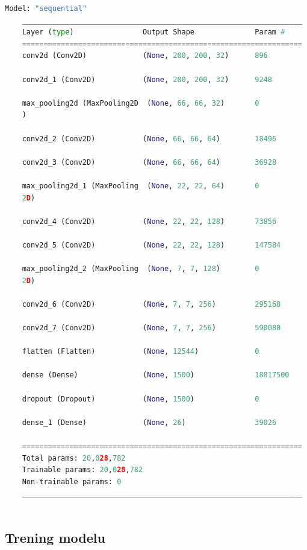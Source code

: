 \documentclass[a4paper,12pt,oneside]{book} %
\begin{document}
\begin{lstlisting}[language=Python, caption={Podsumowanie modelu}, label={lst:modelsum}]
	Model: "sequential"
	_________________________________________________________________
	Layer (type)                Output Shape              Param #   
	=================================================================
	conv2d (Conv2D)             (None, 200, 200, 32)      896       
	
	conv2d_1 (Conv2D)           (None, 200, 200, 32)      9248      
	
	max_pooling2d (MaxPooling2D  (None, 66, 66, 32)       0         
	)                                                               
	
	conv2d_2 (Conv2D)           (None, 66, 66, 64)        18496     
	
	conv2d_3 (Conv2D)           (None, 66, 66, 64)        36928     
	
	max_pooling2d_1 (MaxPooling  (None, 22, 22, 64)       0         
	2D)                                                             
	
	conv2d_4 (Conv2D)           (None, 22, 22, 128)       73856     
	
	conv2d_5 (Conv2D)           (None, 22, 22, 128)       147584    
	
	max_pooling2d_2 (MaxPooling  (None, 7, 7, 128)        0         
	2D)                                                             
	
	conv2d_6 (Conv2D)           (None, 7, 7, 256)         295168    
	
	conv2d_7 (Conv2D)           (None, 7, 7, 256)         590080    
	
	flatten (Flatten)           (None, 12544)             0         
	
	dense (Dense)               (None, 1500)              18817500  
	
	dropout (Dropout)           (None, 1500)              0         
	
	dense_1 (Dense)             (None, 26)                39026     
	
	=================================================================
	Total params: 20,028,782
	Trainable params: 20,028,782
	Non-trainable params: 0
	_________________________________________________________________
	
\end{lstlisting}

\subsection{Trening modelu}
\end{document}
